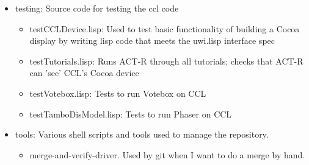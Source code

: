 \documentclass[12pt]{article} %
\begin{document}
\begin{itemize}
\item testing: Source code for testing the ccl code
	\begin{itemize}
	\item testCCLDevice.lisp: Used to test basic functionality of building a Cocoa display by writing lisp code that meets the uwi.lisp interface spec
	\item testTutorials.lisp: Runs ACT-R through all tutorials; checks that ACT-R can 'see' CCL's Cocoa device
	\item testVotebox.lisp: Tests to run Votebox on CCL
	\item testTamboDisModel.lisp: Tests to run Phaser on CCL
	\end{itemize}

\item tools: Various shell scripts and tools used to manage the repository.
	\begin{itemize}
	\item merge-and-verify-driver. Used by git when I want to do a merge by hand.
	\end{itemize}

\end{itemize}
\end{document}
